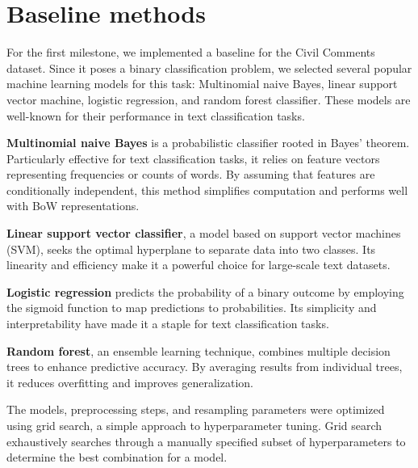 \section{Baseline methods}

For the first milestone, we implemented a baseline for the Civil Comments dataset. Since it poses a binary classification problem, we selected several popular machine learning models for this task: Multinomial naive Bayes, linear support vector machine, logistic regression, and random forest classifier. These models are well-known for their performance in text classification tasks. \cite{Riduan2021}

\textbf{Multinomial naive Bayes} is a probabilistic classifier rooted in Bayes' theorem. Particularly effective for text classification tasks, it relies on feature vectors representing frequencies or counts of words. By assuming that features are conditionally independent, this method simplifies computation and performs well with BoW representations. \cite{Lewis1998}

\textbf{Linear support vector classifier}, a model based on support vector machines (SVM), seeks the optimal hyperplane to separate data into two classes. Its linearity and efficiency make it a powerful choice for large-scale text datasets. \cite{Chang2011}

\textbf{Logistic regression} predicts the probability of a binary outcome by employing the sigmoid function to map predictions to probabilities. Its simplicity and interpretability have made it a staple for text classification tasks. \cite{Hilbe2011}

\textbf{Random forest}, an ensemble learning technique, combines multiple decision trees to enhance predictive accuracy. By averaging results from individual trees, it reduces overfitting and improves generalization. \cite{Breiman2001}

The models, preprocessing steps, and resampling parameters were optimized using grid search, a simple approach to hyperparameter tuning. Grid search exhaustively searches through a manually specified subset of hyperparameters to determine the best combination for a model.




